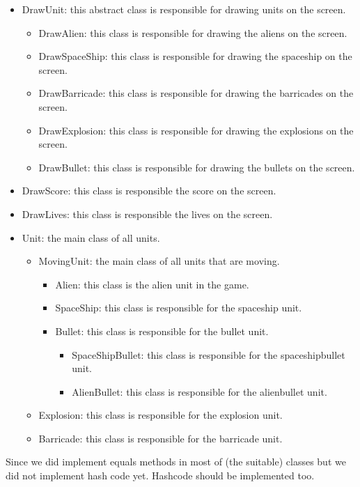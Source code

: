 \documentclass[10pt]{article}
\begin{document}
\begin{itemize}
	\item DrawUnit: this abstract class is responsible for drawing units on the screen.
	\begin{itemize}
		\item DrawAlien: this class is responsible for drawing the aliens on the screen.
		\item DrawSpaceShip: this class is responsible for drawing the spaceship on the screen.
		\item DrawBarricade: this class is responsible for drawing the barricades on the screen.
		\item DrawExplosion: this class is responsible for drawing the explosions on the screen.
		\item DrawBullet: this class is responsible for drawing the bullets on the screen.
	\end{itemize}
	\item DrawScore: this class is responsible the score on the screen.
	\item DrawLives: this class is responsible the lives on the screen.
\end{itemize}
\begin{itemize}
\item Unit: the main class of all units.
\begin{itemize}
\item MovingUnit: the main class of all units that are moving.
\begin{itemize}
\item Alien: this class is the alien unit in the game.
\item SpaceShip: this class is responsible for the spaceship unit.
\item Bullet: this class is responsible for the bullet unit.
\begin{itemize}
\item SpaceShipBullet: this class is responsible for the spaceshipbullet unit.
\item AlienBullet: this class is responsible for the alienbullet unit.
\end{itemize}
\end{itemize}
\item Explosion: this class is responsible for the explosion unit.
\item Barricade: this class is responsible for the barricade unit.
\end{itemize}
\end{itemize}
	
Since we did implement equals methods in most of (the suitable) classes but we did not implement hash code yet. Hashcode should be implemented  too.
\end{document}
